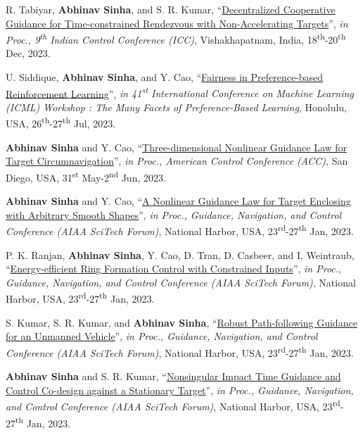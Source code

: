 {\begin{etaremune}[leftmargin=1cm]
		\item R. Tabiyar, \textbf{Abhinav Sinha}, and S. R. Kumar, ``\href{https://ieeexplore.ieee.org/document/10442761}{Decentralized Cooperative Guidance for Time-constrained Rendezvous with Non-Accelerating Targets}'', \emph{in Proc., 9\textsuperscript{th} Indian Control Conference (ICC)}, Vishakhapatnam, India, 18\textsuperscript{th}-20\textsuperscript{th} Dec, 2023.
			\item U. Siddique, \textbf{Abhinav Sinha}, and Y. Cao, ``\href{https://icml.cc/virtual/2023/29078}{Fairness in Preference-based Reinforcement Learning}'', \emph{in 41\textsuperscript{st} International Conference on Machine Learning (ICML) Workshop : The Many Facets of Preference-Based
			Learning}, Honolulu, USA, 26\textsuperscript{th}-27\textsuperscript{th} Jul, 2023.
		\item \textbf{Abhinav Sinha} and Y. Cao, ``\href{https://ieeexplore.ieee.org/document/9924233}{Three-dimensional Nonlinear Guidance Law for Target Circumnavigation}'', \emph{in Proc., American Control Conference (ACC)}, San Diego, USA, 31\textsuperscript{st} May-2\textsuperscript{nd} Jun, 2023.
		\item \textbf{Abhinav Sinha} and Y. Cao, ``\href{https://arc.aiaa.org/doi/10.2514/6.2023-2641}{A Nonlinear Guidance Law for Target Enclosing with Arbitrary Smooth Shapes}'', \emph{in Proc., Guidance, Navigation, and Control Conference (AIAA SciTech Forum)}, National Harbor, USA, 23\textsuperscript{rd}-27\textsuperscript{th} Jan, 2023.
		\item P. K. Ranjan, \textbf{Abhinav Sinha}, Y. Cao, D. Tran, D. Casbeer, and I. Weintraub, ``\href{https://arc.aiaa.org/doi/10.2514/6.2023-2642}{Energy-efficient Ring Formation Control with Constrained Inputs}'', \emph{in Proc., Guidance, Navigation, and Control Conference (AIAA SciTech Forum)}, National Harbor, USA, 23\textsuperscript{rd}-27\textsuperscript{th} Jan, 2023.
		\item S. Kumar, S. R. Kumar, and \textbf{Abhinav Sinha}, ``\href{https://arc.aiaa.org/doi/10.2514/6.2023-1055}{Robust Path-following Guidance for an Unmanned Vehicle}'', \emph{in Proc., Guidance, Navigation, and Control Conference (AIAA SciTech Forum)}, National Harbor, USA, 23\textsuperscript{rd}-27\textsuperscript{th} Jan, 2023.
		\item \textbf{Abhinav Sinha} and S. R. Kumar, ``\href{https://arc.aiaa.org/doi/10.2514/6.2023-1996}{Nonsingular Impact Time Guidance and Control Co-design against a Stationary Target}'', \emph{in Proc., Guidance, Navigation, and Control Conference (AIAA SciTech Forum)}, National Harbor, USA, 23\textsuperscript{rd}-27\textsuperscript{th} Jan, 2023.

\end{etaremune}}
